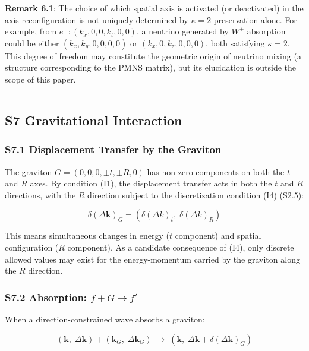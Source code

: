 \documentclass[
  a4paper,11pt]{article}
\theoremstyle{definition}
\theoremstyle{remark}
\begin{document}
\textbf{Remark 6.1}: The choice of which spatial axis is activated (or
deactivated) in the axis reconfiguration is not uniquely determined by
\(\kappa = 2\) preservation alone. For example, from
\(e^-: (k_x, 0, 0, k_t, 0, 0)\), a neutrino generated by \(W^+\)
absorption could be either \((k_x, k_y, 0, 0, 0, 0)\) or
\((k_x, 0, k_z, 0, 0, 0)\), both satisfying \(\kappa = 2\). This degree
of freedom may constitute the geometric origin of neutrino mixing (a
structure corresponding to the PMNS matrix), but its elucidation is
outside the scope of this paper.

\begin{center}\rule{0.5\linewidth}{0.5pt}\end{center}

\subsection{S7 Gravitational
Interaction}\label{s7-gravitational-interaction}

\subsubsection{S7.1 Displacement Transfer by the
Graviton}\label{s7.1-displacement-transfer-by-the-graviton}

The graviton \(G = (0, 0, 0, \pm t, \pm R, 0)\) has non-zero components
on both the \(t\) and \(R\) axes. By condition (I1), the displacement
transfer acts in both the \(t\) and \(R\) directions, with the \(R\)
direction subject to the discretization condition (I4) (S2.5):

\[\delta(\Delta\mathbf{k})_G = (\delta(\Delta k)_t,\; \delta(\Delta k)_R)\]

This means simultaneous changes in energy (\(t\) component) and spatial
configuration (\(R\) component). As a candidate consequence of (I4),
only discrete allowed values may exist for the energy-momentum carried
by the graviton along the \(R\) direction.

\subsubsection{\texorpdfstring{S7.2 Absorption:
\(f + G \to f'\)}{S7.2 Absorption: f + G \textbackslash to f\textquotesingle{}}}\label{s7.2-absorption-f-g-to-f}

When a direction-constrained wave absorbs a graviton:

\[(\mathbf{k},\; \Delta\mathbf{k}) + (\mathbf{k}_G,\; \Delta\mathbf{k}_G) \;\longrightarrow\; (\mathbf{k},\; \Delta\mathbf{k} + \delta(\Delta\mathbf{k})_G)\]
\end{document}
